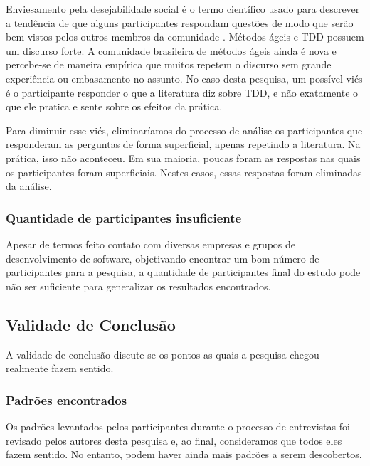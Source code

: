 \documentclass[conference]{IEEEtran}
\begin{document}
Enviesamento pela desejabilidade social é o termo científico usado para descrever
a tendência de que alguns participantes respondam questões de modo que serão
bem vistos pelos outros membros da comunidade \cite{crowne}.
Métodos ágeis e TDD possuem um discurso forte. A comunidade brasileira de métodos
ágeis ainda é nova e percebe-se de maneira empírica que muitos repetem o discurso
sem grande experiência ou embasamento no assunto.
No caso desta pesquisa, um possível viés é o participante responder o que
a literatura diz sobre TDD, e não exatamente o que ele pratica e sente sobre
os efeitos da prática. 

Para diminuir esse viés, eliminaríamos do processo de análise os participantes
que responderam as perguntas de forma superficial, apenas repetindo a literatura. Na prática,
isso não aconteceu. Em sua maioria, poucas foram as respostas nas quais os participantes
foram superficiais. Nestes casos, essas respostas foram eliminadas da análise.

\subsubsection{Quantidade de participantes insuficiente}

Apesar de termos feito contato
com diversas empresas e grupos de desenvolvimento de software,
objetivando encontrar um bom número de participantes para a pesquisa,
a quantidade de participantes final do estudo pode não ser suficiente para generalizar
os resultados encontrados. 

\subsection{Validade de Conclusão}

A validade de conclusão discute se os pontos as quais a pesquisa chegou realmente
fazem sentido.

\subsubsection{Padrões encontrados}

Os padrões levantados pelos participantes durante o processo de entrevistas
foi revisado pelos autores desta pesquisa e, ao final, consideramos que todos
eles fazem sentido.
No entanto, podem haver ainda mais padrões a serem descobertos.
\end{document}
